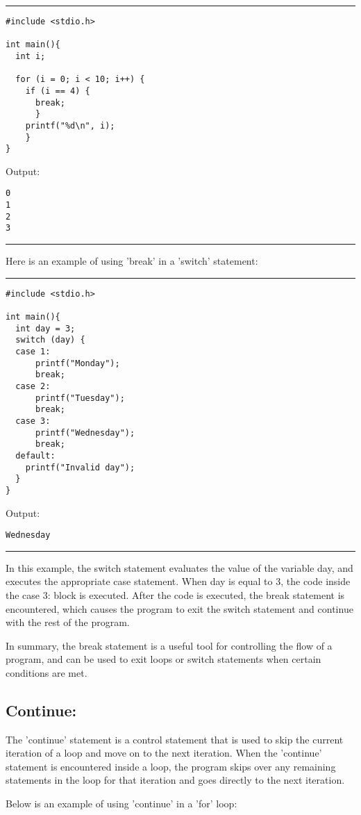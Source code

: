 \documentclass[a4paper]{article}
\begin{document}
\noindent\rule{\textwidth}{0.5pt}
\begin{verbatim}
#include <stdio.h>

int main(){
  int i;

  for (i = 0; i < 10; i++) {
    if (i == 4) {
      break;
      }
    printf("%d\n", i);
    }
}
\end{verbatim}
Output:
\begin{verbatim}
0
1
2
3
\end{verbatim}

\noindent\rule{\textwidth}{0.5pt}
Here is an example of using 'break' in a 'switch' statement:

\noindent\rule{\textwidth}{0.5pt}
\begin{verbatim}
#include <stdio.h>

int main(){
  int day = 3;
  switch (day) {
  case 1:
      printf("Monday");
      break;
  case 2:
      printf("Tuesday");
      break;
  case 3:
      printf("Wednesday");
      break;
  default:
    printf("Invalid day");
  }
}
\end{verbatim}
Output:
\begin{verbatim}
Wednesday
\end{verbatim}

\noindent\rule{\textwidth}{0.5pt}
In this example, the switch statement evaluates the value of the variable day,
and executes the appropriate case statement. When day is equal to 3, the code
inside the case 3: block is executed. After the code is executed, the break
statement is encountered, which causes the program to exit the switch statement
and continue with the rest of the program.

In summary, the break statement is a useful tool for controlling the flow of a
program, and can be used to exit loops or switch statements when certain
conditions are met.



\subsection{Continue:}
\label{sec:org955ef10}
The 'continue' statement is a control statement that is used to skip the current
iteration of a loop and move on to the next iteration. When the 'continue'
statement is encountered inside a loop, the program skips over any remaining
statements in the loop for that iteration and goes directly to the next
iteration.

Below is an example of using 'continue' in a 'for' loop:
\end{document}
